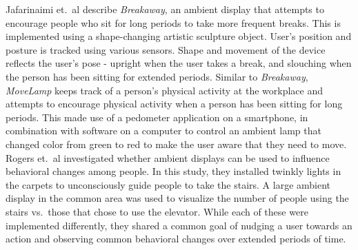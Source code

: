 \documentclass{sigchi-ext}
\begin{document}
Jafarinaimi et.\ al \cite{jafarinaimi2005breakaway} describe
\textit{Breakaway}, an ambient display that attempts to encourage people who
sit for long periods to take more frequent breaks. This is implemented using a
shape-changing artistic sculpture object. User's position and posture is
tracked using various sensors. Shape and movement of the device reflects the
user's pose - upright when the user takes a break, and slouching when the
person has been sitting for extended periods. Similar to \textit{Breakaway},
\textit{MoveLamp} \cite{fortmann2013make} keeps track of a person's physical
activity at the workplace and attempts to encourage physical activity when a
person has been sitting for long periods. This made use of a pedometer
application on a smartphone, in combination with software on a computer to
control an ambient lamp that changed color from green to red to make the user
aware that they need to move. Rogers et.\ al \cite{rogers2010ambient}
investigated whether ambient displays can be used to influence behavioral
changes among people. In this study, they installed twinkly lights in the
carpets to unconsciously guide people to take the stairs. A large ambient
display in the common area was used to visualize the number of people using the
stairs vs.\ those that chose to use the elevator. While each of these were
implemented differently, they shared a common goal of nudging a user towards an
action and observing common behavioral changes over extended periods of time.

\nocite{ishii1997tangible}

\end{document}
